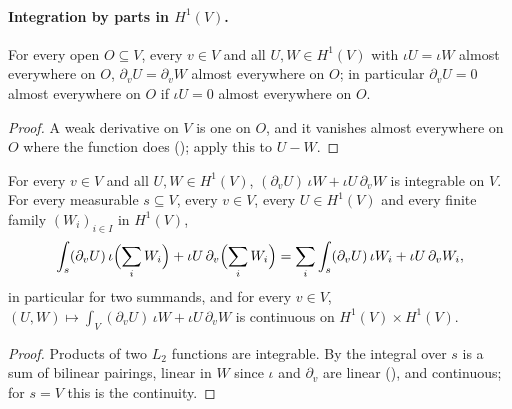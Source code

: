 \paragraph{Integration by parts in $H^1(V)$.}

\begin{lemma}
\label{lem:sobolev-one-weak-derivative-local}
\leanok
{}
For every open $O \subseteq V$, every $v \in V$ and all $U, W \in H^1(V)$ with $\iota U = \iota W$
almost everywhere on $O$, $\partial_v U = \partial_v W$ almost everywhere on $O$; in particular
$\partial_v U = 0$ almost everywhere on $O$ if $\iota U = 0$ almost everywhere on $O$.
\end{lemma}

\begin{proof}
\leanok
A weak derivative on $V$ is one on $O$, and it vanishes almost everywhere on $O$ where the
function does (); apply this to $U - W$.
\end{proof}

\begin{lemma}
\label{lem:green-integrand}
\leanok
{}
For every $v \in V$ and all $U, W \in H^1(V)$, $(\partial_v U) \, \iota W + \iota U \,
\partial_v W$ is integrable on $V$. For every measurable $s \subseteq V$, every $v \in V$, every
$U \in H^1(V)$ and every finite family $(W_i)_{i \in I}$ in $H^1(V)$,
\[
  \int_s (\partial_v U) \, \iota \Bigl(\sum_i W_i\Bigr)
    + \iota U \, \partial_v \Bigl(\sum_i W_i\Bigr)
  = \sum_i \int_s (\partial_v U) \, \iota W_i + \iota U \, \partial_v W_i ,
\]
in particular for two summands, and for every $v \in V$,
$(U, W) \mapsto \int_V (\partial_v U) \, \iota W + \iota U \, \partial_v W$ is continuous on
$H^1(V) \times H^1(V)$.
\end{lemma}

\begin{proof}
\leanok
Products of two $L_2$ functions are integrable. By  the integral over
$s$ is a sum of bilinear pairings, linear in $W$ since $\iota$ and $\partial_v$ are linear
(), and continuous; for $s = V$ this is the
continuity.
\end{proof}

